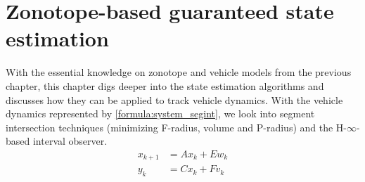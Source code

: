 \chapter{Zonotope-based guaranteed state estimation} \label{ch:state_estimation}
With the essential knowledge on zonotope and vehicle models from the previous chapter, this chapter digs deeper into the state estimation algorithms and discusses how they can be applied to track vehicle dynamics. With the vehicle dynamics represented by \ref{formula:system_segint}, we look into segment intersection techniques (minimizing F-radius, volume and P-radius) and the H-$\infty$-based interval observer.
\begin{equation}
\label{formula:system_segint}
\begin{split}
x_{k+1} &= Ax_k + Ew_k\\
y_k &= Cx_k + Fv_k
\end{split}
\end{equation}
